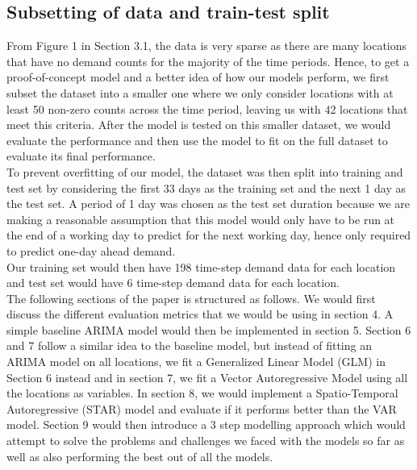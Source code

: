 \documentclass[nonblindrev,msom]{informs3} %
\begin{document}
\newpage

\subsection{Subsetting of data and train-test split}
From Figure 1 in Section 3.1, the data is very sparse as there are many locations that have no demand counts for the majority of the time periods. Hence, to get a proof-of-concept model and a better idea of how our models perform, we first subset the dataset into a smaller one where we only consider locations with at least 50 non-zero counts across the time period, leaving us with 42 locations that meet this criteria. After the model is tested on this smaller dataset, we would evaluate the performance and then use the model to fit on the full dataset to evaluate its final performance. \\

\noindent To prevent overfitting of our model, the dataset was then split into training and test set by considering the first 33 days as the training set and the next 1 day as the test set. A period of 1 day was chosen as the test set duration because we are making a reasonable assumption that this model would only have to be run at the end of a working day to predict for the next working day, hence only required to predict one-day ahead demand. \\

\noindent Our training set would then have 198 time-step demand data for each location and test set would have 6 time-step demand data for each location. \\

\noindent The following sections of the paper is structured as follows. We would first discuss the different evaluation metrics that we would be using in section 4. 
A simple baseline ARIMA model would then be implemented in section 5. Section 6 and 7 follow a similar idea to the baseline model, but instead of fitting an ARIMA model on all locations, we fit a Generalized Linear Model (GLM) in Section 6 instead and in section 7, we fit a Vector Autoregressive Model using all the locations as variables. In section 8, we would implement a Spatio-Temporal Autoregressive (STAR) model and evaluate if it performs better than the VAR model. Section 9 would then introduce a 3 step modelling approach which would attempt to solve the problems and challenges we faced with the models so far as well as also performing the best out of all the models. 
\end{document}
